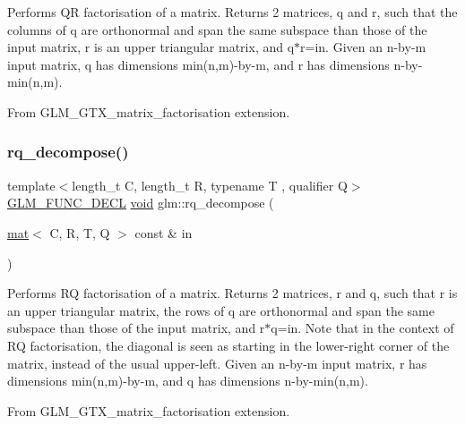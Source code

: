 Performs QR factorisation of a matrix. Returns 2 matrices, q and r, such that the columns of q are orthonormal and span the same subspace than those of the input matrix, r is an upper triangular matrix, and q$\ast$r=in. Given an n-\/by-\/m input matrix, q has dimensions min(n,m)-\/by-\/m, and r has dimensions n-\/by-\/min(n,m).

From G\+L\+M\+\_\+\+G\+T\+X\+\_\+matrix\+\_\+factorisation extension. \mbox{\label{group__gtx__matrix__factorisation_ga4e022709c9e7eaad9d7cc315d2cdb05c}} 
\subsubsection{\texorpdfstring{rq\+\_\+decompose()}{rq\_decompose()}}
{\footnotesize\ttfamily template$<$length\+\_\+t C, length\+\_\+t R, typename T , qualifier Q$>$ \\
\hyperlink{setup_8hpp_ab2d052de21a70539923e9bcbf6e83a51}{G\+L\+M\+\_\+\+F\+U\+N\+C\+\_\+\+D\+E\+CL} \hyperlink{_s_d_l__opengles2__gl2ext_8h_ae5d8fa23ad07c48bb609509eae494c95}{void} glm\+::rq\+\_\+decompose (\begin{DoxyParamCaption}\item[{\hyperlink{structglm_1_1mat}{mat}$<$ C, R, T, Q $>$ const \&}]{in }\end{DoxyParamCaption})}

Performs RQ factorisation of a matrix. Returns 2 matrices, r and q, such that r is an upper triangular matrix, the rows of q are orthonormal and span the same subspace than those of the input matrix, and r$\ast$q=in. Note that in the context of RQ factorisation, the diagonal is seen as starting in the lower-\/right corner of the matrix, instead of the usual upper-\/left. Given an n-\/by-\/m input matrix, r has dimensions min(n,m)-\/by-\/m, and q has dimensions n-\/by-\/min(n,m).

From G\+L\+M\+\_\+\+G\+T\+X\+\_\+matrix\+\_\+factorisation extension. 